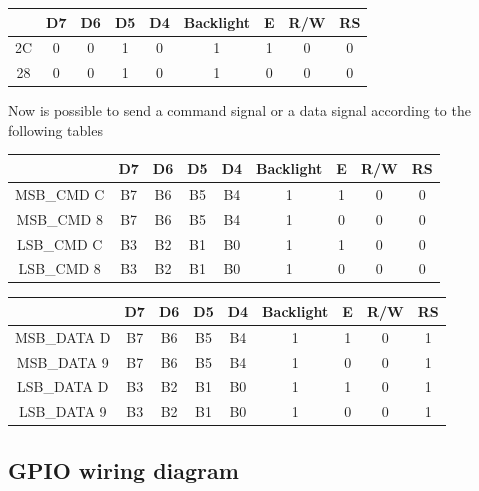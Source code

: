 \documentclass[]{article}
\begin{document}
\begin{center}
    \begin{tabular}{|c|c|c|c|c|c|c|c|c|} 
        \hline
        & D7 & D6 & D5 & D4 & Backlight & E & R/W & RS \\
        \hline
        2C & 0 & 0 & 1 & 0 & 1 & 1 & 0 & 0 \\
        28 & 0 & 0 & 1 & 0 & 1 & 0 & 0 & 0 \\
        \hline
    \end{tabular}
\end{center}

Now is possible to send a command signal or a data signal according to the following tables

\begin{center}
    \begin{tabular}{|c|c|c|c|c|c|c|c|c|} 
        \hline
        & D7 & D6 & D5 & D4 & Backlight & E & R/W & RS \\
        \hline
        MSB\_CMD C & B7 & B6 & B5 & B4 & 1 & 1 & 0 & 0 \\
        MSB\_CMD 8 & B7 & B6 & B5 & B4 & 1 & 0 & 0 & 0 \\
        LSB\_CMD C & B3 & B2 & B1 & B0 & 1 & 1 & 0 & 0 \\
        LSB\_CMD 8 & B3 & B2 & B1 & B0 & 1 & 0 & 0 & 0 \\
        \hline
    \end{tabular}
\end{center}

\begin{center}
    \begin{tabular}{|c|c|c|c|c|c|c|c|c|} 
        \hline
        & D7 & D6 & D5 & D4 & Backlight & E & R/W & RS \\
        \hline
        MSB\_DATA D & B7 & B6 & B5 & B4 & 1 & 1 & 0 & 1 \\
        MSB\_DATA 9 & B7 & B6 & B5 & B4 & 1 & 0 & 0 & 1 \\
        LSB\_DATA D & B3 & B2 & B1 & B0 & 1 & 1 & 0 & 1 \\
        LSB\_DATA 9 & B3 & B2 & B1 & B0 & 1 & 0 & 0 & 1 \\
        \hline
    \end{tabular}
\end{center}


\subsection{GPIO wiring diagram}
\end{document}
